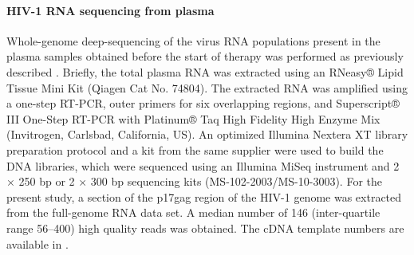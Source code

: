 \documentclass[aps,rmp,onecolumn,linenumbers]{revtex4-1}
\begin{document}
\paragraph*{HIV-1 RNA sequencing from plasma}
Whole-genome deep-sequencing of the virus RNA populations present in the plasma samples obtained before the start of therapy was performed as previously described \cite{zanini_population_2016}. Briefly, the total plasma RNA was extracted using an RNeasy® Lipid Tissue Mini Kit (Qiagen Cat No. 74804). The extracted RNA was amplified using a one-step RT-PCR, outer primers for six overlapping regions, and Superscript® III One-Step RT-PCR with Platinum® Taq High Fidelity High Enzyme Mix (Invitrogen, Carlsbad, California, US). An optimized Illumina Nextera XT library preparation protocol and a kit from the same supplier were used to build the DNA libraries, which were sequenced using an Illumina MiSeq instrument and 2 × 250 bp or 2 × 300 bp sequencing kits (MS-102-2003/MS-10-3003). For the present study, a section of the p17gag region of the HIV-1 genome was extracted from the full-genome RNA data set. A median number of 146 (inter-quartile range 56--400) high quality reads was obtained. The cDNA template numbers are available in \citet{zanini_population_2016}.
\end{document}
